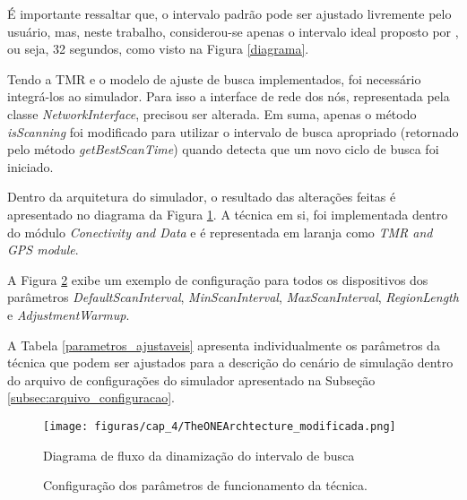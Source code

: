 É importante ressaltar que, o intervalo padrão pode ser ajustado livremente pelo usuário, mas, neste trabalho, considerou-se apenas o intervalo ideal proposto por \cite{denis_artigo}, ou seja, 32 segundos, como visto na Figura \ref{diagrama}.

Tendo a TMR e o modelo de ajuste de busca implementados, foi necessário integrá-los ao simulador. Para isso a interface de rede dos nós, representada pela classe \emph{NetworkInterface}, precisou ser alterada. Em suma, apenas o método \emph{isScanning} foi modificado para utilizar o intervalo de busca apropriado (retornado pelo método \emph{getBestScanTime}) quando detecta que um novo ciclo de busca foi iniciado.

Dentro da arquitetura do simulador, o resultado das alterações feitas é apresentado no diagrama da Figura \ref{theOne_modificado}. A técnica em si, foi implementada dentro do módulo \emph{Conectivity and Data} e é representada em laranja como \emph{TMR and GPS module}.

A Figura \ref{tecnica_config} exibe um exemplo de configuração para todos os dispositivos dos parâmetros \emph{DefaultScanInterval}, \emph{MinScanInterval}, \emph{MaxScanInterval}, \emph{RegionLength} e \emph{AdjustmentWarmup}.

A Tabela \ref{parametros_ajustaveis} apresenta individualmente os parâmetros da técnica que podem ser ajustados para a descrição do cenário de simulação dentro do arquivo de configurações do simulador apresentado na Subseção \ref{subsec:arquivo_configuracao}.
\begin{figure}[htp!]
\centering
\texttt{[image: figuras/cap\_4/TheONEArchtecture\_modificada.png]}
\caption{Diagrama de fluxo da dinamização do intervalo de busca}
\label{theOne_modificado}
\end{figure}

\begin{figure}[htp!]
\centering

\caption{Configuração dos parâmetros de funcionamento da técnica.}
\label{tecnica_config}
\end{figure}


